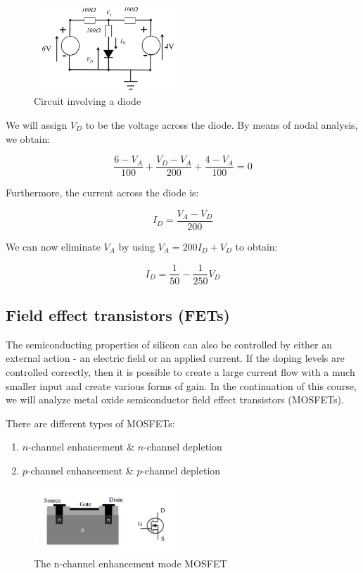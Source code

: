 \documentclass{article}
\begin{document}
\newpage

\begin{figure}[h]
    \centering
    \includegraphics[width = 0.5\textwidth]{images/diode4.png}
    \caption{Circuit involving a diode}
    \label{fig:diode-circuit}
\end{figure}

We will assign $V_D$ to be the voltage across the diode. By means of nodal analysis, we obtain:

\[ \frac{6 - V_A}{100} + \frac{V_D - V_A}{200} + \frac{4 - V_A}{100} = 0 \]

Furthermore, the current across the diode is:

\[ I_D = \frac{V_A - V_D}{200} \]

We can now eliminate $V_A$ by using $V_A = 200I_D + V_D$ to obtain:

\[ I_D = \frac{1}{50} - \frac{1}{250}V_D \]

\newpage

\subsection{Field effect transistors (FETs)}

The semiconducting properties of silicon can also be controlled by either an external action - an electric field or an applied current. If the doping levels are controlled correctly, then it is possible to create a large current flow with a much smaller input and create various forms of gain. In the continuation of this course, we will analyze metal oxide semiconductor field effect transistors (MOSFETs).

There are different types of MOSFETs:

\begin{enumerate}
    \item $n$-channel enhancement \& $n$-channel depletion
    \item $p$-channel enhancement \& $p$-channel depletion
\end{enumerate}

\begin{figure}[h]
    \centering
    \includegraphics[width = 0.5\textwidth]{images/fet1.png}
    \caption{The n-channel enhancement mode MOSFET}
    \label{fig:fet1}
\end{figure}
\end{document}
